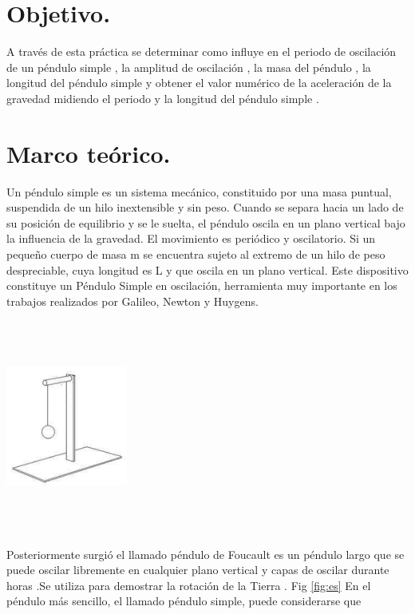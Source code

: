 \documentclass[10pt]{article}
\begin{document}
\begin{multicols}{2}

\section{Objetivo.}
A través de esta práctica se determinar como influye en el periodo de oscilación de un péndulo simple  , la amplitud de oscilación , la masa del péndulo , la longitud del péndulo simple y obtener el valor numérico de la aceleración de la gravedad midiendo el periodo y la longitud del péndulo simple .



\section{Marco teórico.}
Un péndulo simple es un sistema mecánico, constituido por una masa puntual, suspendida de un hilo inextensible y sin peso. Cuando se separa hacia un lado de su posición de equilibrio y se le suelta, el péndulo oscila en un plano vertical bajo la influencia de la gravedad. El movimiento es periódico y oscilatorio. Si un pequeño cuerpo de masa m se encuentra sujeto al extremo de un hilo de peso despreciable, cuya longitud es L y que oscila en un plano vertical. Este dispositivo constituye un Péndulo Simple en oscilación, herramienta muy importante en los trabajos realizados por Galileo, Newton y Huygens.
\begin{center}
	\includegraphics[width=4cm, height=7cm]{Imagenes/pendulo.png}
	\label{fig:es}
\end{center}
Posteriormente surgió el llamado péndulo de Foucault es un péndulo largo que se puede oscilar libremente en cualquier plano vertical y capas de oscilar durante horas .Se utiliza para demostrar la rotación de la Tierra . Fig \ref{fig:es}
En el péndulo más sencillo, el llamado péndulo simple, puede considerarse que

\end{multicols}
\end{document}
